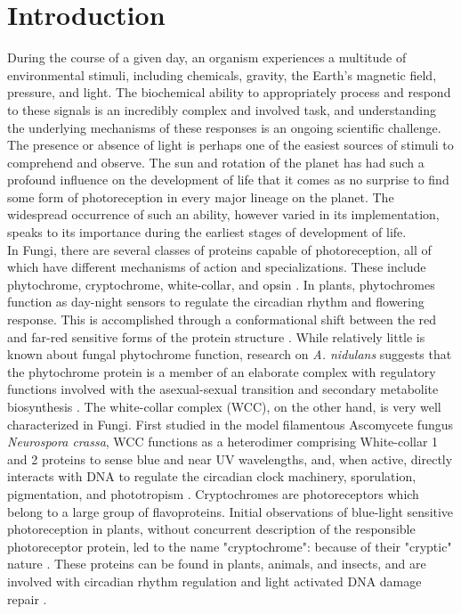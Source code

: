 \section{Introduction}
During the course of a given day, an organism experiences a multitude of environmental stimuli, including chemicals, gravity, the Earth's magnetic field, pressure, and light. The biochemical ability to appropriately process and respond to these signals is an incredibly complex and involved task, and understanding the underlying mechanisms of these responses is an ongoing scientific challenge. \\
\indent The presence or absence of light is perhaps one of the easiest sources of stimuli to comprehend and observe. The sun and rotation of the planet has had such a profound influence on the development of life that it comes as no surprise to find some form of photoreception in every major lineage on the planet. The widespread occurrence of such an ability, however varied in its implementation, speaks to its importance during the earliest stages of development of life. \\
\indent In Fungi, there are several classes of proteins capable of photoreception, all of which have different mechanisms of action and specializations. These include phytochrome, cryptochrome, white-collar, and opsin \cite{Idnurm2010}. In plants, phytochromes function as day-night sensors to regulate the circadian rhythm and flowering response. This is accomplished through a conformational shift between the red and far-red sensitive forms of the protein structure \cite{Rockwell2006}. While relatively little is known about fungal phytochrome function, research on \textit{A. nidulans} suggests that the phytochrome protein is a member of an elaborate complex with regulatory functions involved with the asexual-sexual transition and secondary metabolite biosynthesis \cite{Idnurm2010}. The white-collar complex (WCC), on the other hand, is very well characterized in Fungi. First studied in the model filamentous Ascomycete fungus \textit{Neurospora crassa}, WCC functions as a heterodimer comprising White-collar 1 and 2 proteins to sense blue and near UV wavelengths, and, when active, directly interacts with DNA to regulate the circadian clock machinery, sporulation, pigmentation, and phototropism \cite{Ballario1997,Purschwitz2006,Corrochano2007}. Cryptochromes are photoreceptors which belong to a large group of flavoproteins. Initial observations of blue-light sensitive photoreception in plants, without concurrent description of the responsible photoreceptor protein, led to the name "cryptochrome": because of their "cryptic" nature \cite{Cashmore1999}. These proteins can be found in plants, animals, and insects, and are involved with circadian rhythm regulation and light activated DNA damage repair \cite{Idnurm2010}.\\
